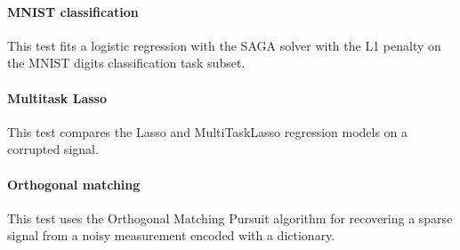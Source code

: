 \documentclass[11pt]{article}
\begin{document}
\paragraph{MNIST classification}

This test fits a logistic regression with the SAGA solver with the L1 penalty on the MNIST digits classification task subset.




\paragraph{Multitask Lasso}

This test compares the Lasso and MultiTaskLasso regression models
on a corrupted signal.



\paragraph{Orthogonal matching}

This test uses the Orthogonal Matching Pursuit algorithm
for recovering a sparse signal from a noisy measurement encoded with a dictionary.
\end{document}
